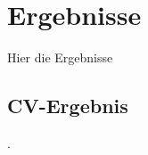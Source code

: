 
\section{Ergebnisse}
\label{sec:cv:ergebnisse}

Hier die Ergebnisse

\subsection{CV-Ergebnis}
\label{sec:cv_ergebnis}

.
